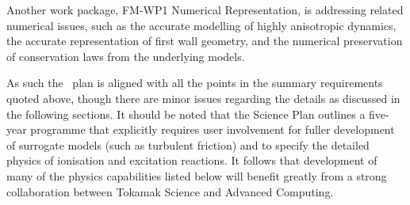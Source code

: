 Another work package, FM-WP1 Numerical Representation, is addressing related
numerical issues, such as
the accurate modelling of highly anisotropic dynamics,
the accurate representation of first wall geometry,
and the numerical preservation of conservation laws from the underlying models.

As such the \nep\ plan is aligned with all the points in the summary
requirements quoted above, though there are minor issues regarding
the details as discussed in the following sections.
It should be noted that the Science Plan outlines a five-year programme that
explicitly requires user involvement for fuller development of surrogate
models (such as turbulent friction) and to specify the detailed physics of
ionisation and excitation reactions.
It follows that development of many of the physics capabilities listed below will benefit
greatly from a strong collaboration between
Tokamak Science and Advanced Computing.
